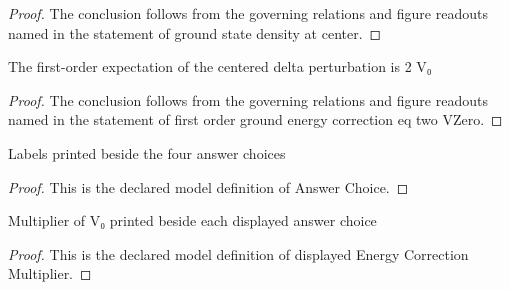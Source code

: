 \begin{proof}
  The conclusion follows from the governing relations and figure readouts named in the statement of ground state density at center.
\end{proof}
\begin{lemma}
  \label{lem:physics:phyx-mini-0546:phyxminiproblems-problemphyxmini0546-first-order-ground-energy-correction-eq-two-vzero}
  The first-order expectation of the centered delta perturbation is 2 V₀
\end{lemma}
\begin{proof}
  The conclusion follows from the governing relations and figure readouts named in the statement of first order ground energy correction eq two VZero.
\end{proof}
\begin{definition}
  \label{def:physics:phyx-mini-0546:phyxminiproblems-problemphyxmini0546-answerchoice}
  Labels printed beside the four answer choices
\end{definition}
\begin{proof}
  This is the declared model definition of Answer Choice.
\end{proof}
\begin{definition}
  \label{def:physics:phyx-mini-0546:phyxminiproblems-problemphyxmini0546-displayedenergycorrectionmultiplier}
  Multiplier of V₀ printed beside each displayed answer choice
\end{definition}
\begin{proof}
  This is the declared model definition of displayed Energy Correction Multiplier.
\end{proof}
